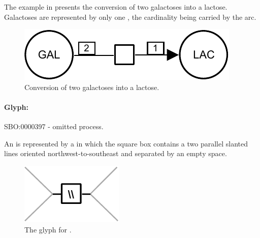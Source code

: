 The example in  presents the conversion of two galactoses into a lactose.  Galactoses are represented by only one , the cardinality being carried by the  arc.

\begin{figure}[htb]
  \centering
  \includegraphics[scale = 0.3]{examples/process-dimerisation}
  \caption{Conversion of two galactoses into a lactose.}
  \label{fig:techref:trans-dim}
\end{figure}



\paragraph{Glyph: }\label{sec:techref:omitted}


\begin{glyphDescription}
 \glyphSboTerm SBO:0000397 - omitted process.

 \glyphNode An  is represented by a  in which the square box contains a two parallel slanted lines oriented northwest-to-southeast and separated by an empty space.
 \end{glyphDescription}

\begin{figure}[htb]
  \centering
  \includegraphics[scale = 0.5]{images/omitted}
  \caption{The \PD glyph for .}
  \label{fig:techref:omitted}
\end{figure}



